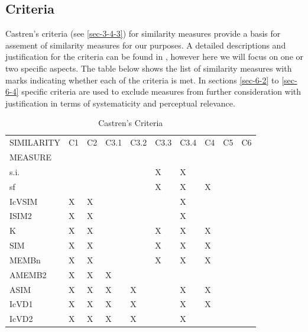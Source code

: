 \documentclass{article}
\begin{document}
\subsection{Criteria}
\label{sec-6-1}

Castren's criteria (see \ref{sec-3-4-3}) for similarity measures
provide a basis for assement of similarity measures for our
purposes. A detailed descriptions and justification for the criteria
can be found in \citet[chap. 2]{Castren1994}, however here we will
focus on one or two specific aspects. The table below shows the list
of similarity measures with marks indicating whether each of the
criteria is met. In sections \ref{sec-6-2} to \ref{sec-6-4} specific
criteria are used to exclude measures from further consideration with
justification in terms of systematicity and perceptual relevance.
\begin{table}[htb]
\caption{Castren's Criteria} 
\begin{center}
\begin{tabular}{llllllllll}
 SIMILARITY  &  C1  &  C2  &  C3.1  &  C3.2  &  C3.3  &  C3.4  &  C4  &  C5  &  C6  \\
 MEASURE     &      &      &        &        &        &        &      &      &      \\
\hline
 s.i.        &      &      &        &        &  X     &  X     &      &      &      \\
 sf          &      &      &        &        &  X     &  X     &  X   &      &      \\
 IcVSIM      &  X   &  X   &        &        &        &  X     &      &      &      \\
 ISIM2       &  X   &  X   &        &        &        &  X     &      &      &      \\
 K           &  X   &  X   &        &        &  X     &  X     &  X   &      &      \\
 SIM         &  X   &  X   &        &        &  X     &  X     &  X   &      &      \\
 MEMBn       &  X   &  X   &        &        &  X     &  X     &  X   &      &      \\
 AMEMB2      &  X   &  X   &  X     &        &        &        &      &      &      \\
 ASIM        &  X   &  X   &  X     &  X     &        &  X     &  X   &      &      \\
 IcVD1       &  X   &  X   &  X     &  X     &        &  X     &  X   &      &      \\
 IcVD2       &  X   &  X   &  X     &  X     &        &  X     &      &      &      \\

\end{tabular}
\end{center}
\end{table}
\end{document}
